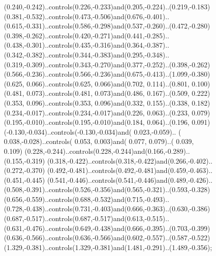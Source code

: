 \begin{figure}[H]
\begin{floatrow}
{{\begin{scope}[#2,rotate=#1]
                    (0.240,-0.242)..controls(0.226,-0.233)and(0.205,-0.224)..(0.219,-0.183)
                    (0.381,-0.532)..controls(0.473,-0.506)and(0.676,-0.401)..
                    (0.615,-0.331)..controls(0.586,-0.298)and(0.537,-0.260)..(0.472,-0.280)
                    (0.398,-0.262)..controls(0.420,-0.271)and(0.441,-0.285)..
                    (0.438,-0.301)..controls(0.435,-0.316)and(0.364,-0.387)..
                    (0.342,-0.382)..controls(0.344,-0.383)and(0.295,-0.348)..
                    (0.319,-0.309)..controls(0.343,-0.270)and(0.377,-0.252)..(0.398,-0.262)
                    (0.566,-0.236)..controls(0.566,-0.236)and(0.675,-0.413)..(1.099,-0.380)
                    (0.625, 0.066)..controls(0.625, 0.066)and(0.702, 0.114)..(0.801, 0.100)
                    (0.481, 0.073)..controls(0.481, 0.073)and(0.486, 0.167)..(0.509, 0.222)
                    (0.353, 0.096)..controls(0.353, 0.096)and(0.332, 0.155)..(0.338, 0.182)
                    (0.234,-0.017)..controls(0.234,-0.017)and(0.226, 0.063)..(0.233, 0.079)
                    (0.195,-0.010)..controls(0.195,-0.010)and(0.184, 0.064)..(0.196, 0.091)
                    (-0.130,-0.034)..controls(-0.130,-0.034)and( 0.023,-0.059)..
                    ( 0.038,-0.028)..controls( 0.053, 0.003)and( 0.077, 0.079)..( 0.039, 0.109)
                    (0.228,-0.244)..controls(0.228,-0.244)and(0.166,-0.289)..(0.155,-0.319)
                    (0.318,-0.422)..controls(0.318,-0.422)and(0.266,-0.402)..(0.272,-0.370)
                    (0.492,-0.481)..controls(0.492,-0.481)and(0.459,-0.463)..(0.451,-0.445)
                    (0.541,-0.446)..controls(0.541,-0.446)and(0.489,-0.426)..
                    (0.508,-0.391)..controls(0.526,-0.356)and(0.565,-0.321)..(0.593,-0.328)
                    (0.656,-0.559)..controls(0.688,-0.532)and(0.715,-0.493)..
                    (0.728,-0.438)..controls(0.731,-0.403)and(0.666,-0.363)..(0.630,-0.386)
                    (0.687,-0.517)..controls(0.687,-0.517)and(0.613,-0.515)..
                    (0.631,-0.476)..controls(0.649,-0.438)and(0.666,-0.395)..(0.703,-0.399)
                    (0.636,-0.566)..controls(0.636,-0.566)and(0.602,-0.557)..(0.587,-0.522)
                    (1.329,-0.381)..controls(1.329,-0.381)and(1.481,-0.291)..(1.489,-0.356);
                \end{scope}
            }
            }
\end{floatrow}
\end{figure}
